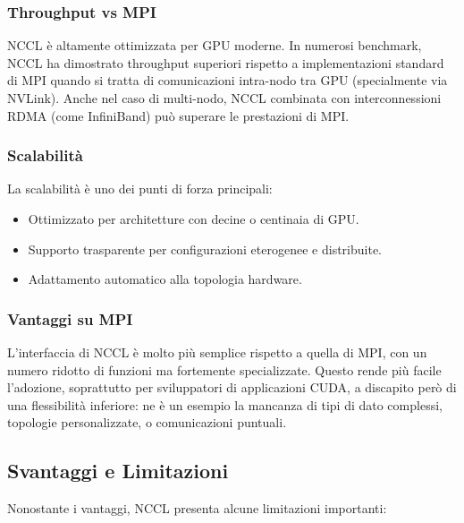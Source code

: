 \documentclass[a4paper]{article}
\begin{document}
\subsubsection{Throughput vs MPI}

NCCL è altamente ottimizzata per GPU moderne. In numerosi benchmark, NCCL ha dimostrato throughput superiori rispetto a implementazioni standard di MPI quando si tratta di comunicazioni intra-nodo tra GPU (specialmente via NVLink). Anche nel caso di multi-nodo, NCCL combinata con interconnessioni RDMA (come InfiniBand) può superare le prestazioni di MPI.

\subsubsection{Scalabilità}

La scalabilità è uno dei punti di forza principali:

\begin{itemize}
    \item Ottimizzato per architetture con decine o centinaia di GPU.
    \item Supporto trasparente per configurazioni eterogenee e distribuite.
    \item Adattamento automatico alla topologia hardware.
\end{itemize}

\subsubsection{Vantaggi su MPI}

L'interfaccia di NCCL è molto più semplice rispetto a quella di MPI, con un numero ridotto di funzioni ma fortemente specializzate. Questo rende più facile l’adozione, soprattutto per sviluppatori di applicazioni CUDA, a discapito però di una flessibilità inferiore: ne è un esempio la mancanza di tipi di dato complessi, topologie personalizzate, o comunicazioni puntuali.

\subsection{Svantaggi e Limitazioni}

Nonostante i vantaggi, NCCL presenta alcune limitazioni importanti:
\end{document}
